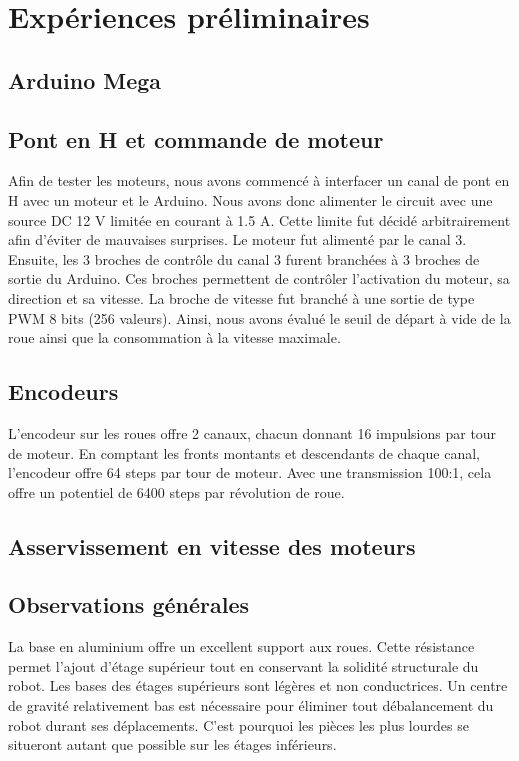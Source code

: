 
\chapter{Expériences préliminaires}

\section{Arduino Mega}

\section{Pont en H et commande de moteur}

Afin de tester les moteurs, nous avons commencé à interfacer un canal de pont en H avec un moteur et le Arduino. Nous avons donc alimenter le circuit avec une source DC 12 V limitée en courant à 1.5 A. Cette limite fut décidé arbitrairement afin d'éviter de mauvaises surprises. Le moteur fut alimenté par le canal 3. Ensuite, les 3 broches de contrôle du canal 3 furent branchées à 3 broches de sortie du Arduino. Ces broches permettent de contrôler l'activation du moteur, sa direction et sa vitesse.  La broche de vitesse fut branché à une sortie de type PWM 8 bits (256 valeurs). Ainsi, nous avons évalué le seuil de départ à vide de la roue ainsi que la consommation à la vitesse maximale. 

\section{Encodeurs}

L'encodeur sur les roues offre 2 canaux, chacun donnant 16 impulsions par tour de moteur. En comptant les fronts montants et descendants de chaque canal, l'encodeur offre 64 steps par tour de moteur. Avec une transmission 100:1, cela offre un potentiel de 6400 steps par révolution de roue.

\section{Asservissement en vitesse des moteurs}
\section{Observations générales}
  La base en aluminium offre un excellent support aux roues. Cette résistance permet l’ajout d’étage supérieur tout en conservant la solidité structurale du robot. Les bases des étages supérieurs sont légères et non conductrices. Un centre de gravité relativement bas est nécessaire pour éliminer tout débalancement du robot durant ses déplacements. C’est pourquoi les pièces les plus lourdes se situeront autant que possible sur les étages inférieurs.

